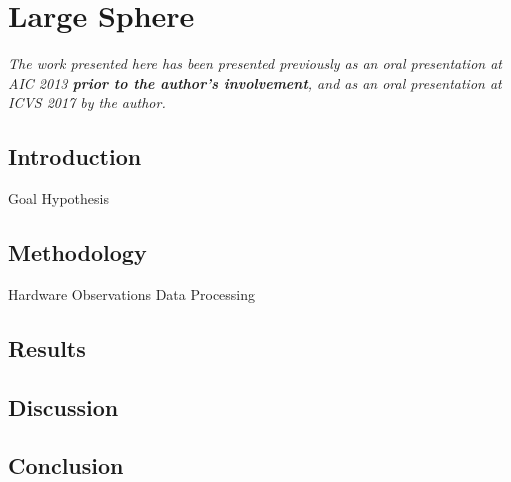 \chapter{Large Sphere}
\label{chap:LargeSphere}

\textit{The work presented here has been presented previously as an oral presentation at AIC 2013 \citep[p. 623]{macdonald_chromatic_2013} \textbf{prior to the author's involvement}, and as an oral presentation at ICVS 2017 \citep[p. 35/58]{jan_kremers_24th_2017} by the author.}

\section{Introduction}

Goal
Hypothesis

\section{Methodology}

Hardware
Observations
Data Processing

\section{Results}
\section{Discussion}
\section{Conclusion}